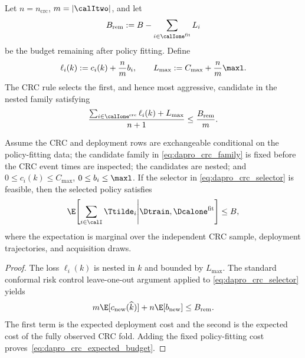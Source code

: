 Let $n=n_{\mathrm{crc}}$, $m=|\calItwo|$, and let
\begin{equation}
    B_{\mathrm{rem}}
    :=B-\sum_{i\in\calIone^{\mathrm{fit}}}L_i
\end{equation}
be the budget remaining after policy fitting.  Define
\begin{equation}
    \ell_i(k):=c_i(k)+\frac{n}{m}b_i,
    \qquad
    L_{\max}:=C_{\max}+\frac{n}{m}\maxl.
\end{equation}
The CRC rule selects the first, and hence most aggressive, candidate in the
nested family satisfying
\begin{equation}
    \frac{
      \sum_{i\in\calIone^{\mathrm{crc}}}\ell_i(k)+L_{\max}
    }{n+1}
    \leq \frac{B_{\mathrm{rem}}}{m}.
    \label{eq:dapro_crc_selector}
\end{equation}

\begin{theorem}
\label{thm:dapro_crc_budget}
Assume the CRC and deployment rows are exchangeable conditional on the
policy-fitting data; the candidate family in
\eqref{eq:dapro_crc_family} is fixed before the CRC event times are inspected;
the candidates are nested; and $0\leq c_i(k)\leq C_{\max}$,
$0\leq b_i\leq\maxl$.  If the selector in
\eqref{eq:dapro_crc_selector} is feasible, then the selected policy satisfies
\begin{equation}
    \E\!\left[
      \sum_{i\in\calI}\Ttilde_i
      \middle|\Dtrain,\Dcalone^{\mathrm{fit}}
    \right]\leq B,
    \label{eq:dapro_crc_expected_budget}
\end{equation}
where the expectation is marginal over the independent CRC sample,
deployment trajectories, and acquisition draws.
\end{theorem}

\begin{proof}
The loss $\ell_i(k)$ is nested in $k$ and bounded by $L_{\max}$.  The standard
conformal risk control leave-one-out argument
\cite{angelopoulos2024conformal} applied to
\eqref{eq:dapro_crc_selector} yields
\begin{equation}
    m\E[c_{\mathrm{new}}(\widehat k)]
    +n\E[b_{\mathrm{new}}]
    \leq B_{\mathrm{rem}}.
\end{equation}
The first term is the expected deployment cost and the second is the expected
cost of the fully observed CRC fold.  Adding the fixed policy-fitting cost
proves~\eqref{eq:dapro_crc_expected_budget}.
\end{proof}

